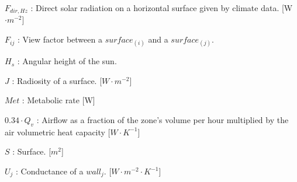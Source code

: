 \documentclass[runningheads]{llncs}
\begin{document}
$F_{dir,Hz}$ : Direct solar radiation on a horizontal surface given by climate data. [W$\cdot m^{-2}$]
  
$F_{ij}$ : View factor between a $surface_{(i)}$ and a $surface_{(j)}$.
  
$H_s$ : Angular height of the sun. 
  
$J$ : Radiosity of a surface. [$W\cdot m^{-2}$]

$Met$ : Metabolic rate [W]

$0.34\cdot Q_v$ : Airflow as a fraction of the zone's volume per hour multiplied by the air volumetric heat capacity [$W\cdot K^{-1}$]
  
$S$ : Surface. [$m^2$]
  
$U_j$ : Conductance of a $wall_j$. [$W\cdot m^{-2}\cdot K^{-1}$]



\end{document}
